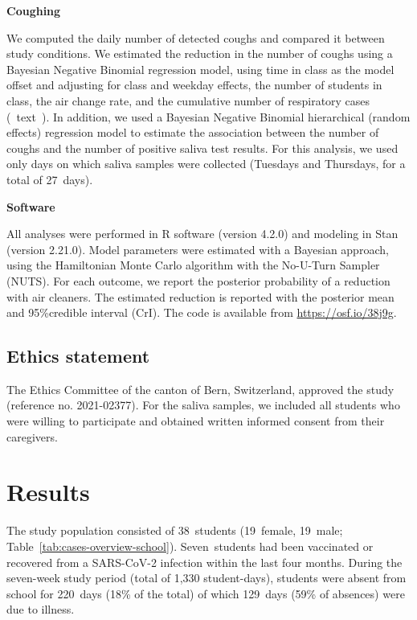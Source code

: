 \documentclass[fleqn,11pt]{wlscirep}
\begin{document}
\noindent\textbf{Coughing} \smallskip

\noindent We computed the daily number of detected coughs and compared it between study conditions. We estimated the reduction in the number of coughs using a Bayesian Negative Binomial regression model, using time in class as the model offset and adjusting for class and weekday effects, the number of students in class, the air change rate, and the cumulative number of respiratory cases (\supp~text~). In addition, we used a Bayesian Negative Binomial hierarchical (random effects) regression model to estimate the association between the number of coughs and the number of positive saliva test results. For this analysis, we used only days on which saliva samples were collected (Tuesdays and Thursdays, for a total of 27~days).  \medskip

\noindent\textbf{Software}\smallskip

\noindent All analyses were performed in R software (version 4.2.0)\cite{RCoreTeam2022} and modeling in Stan (version 2.21.0)\cite{Carpenter2017}. Model parameters were estimated with a Bayesian approach, using the Hamiltonian Monte Carlo algorithm with the No-U-Turn Sampler (NUTS)\cite{Hoffman2014}. For each outcome, we report the posterior probability of a reduction with air cleaners. The estimated reduction is reported with the posterior mean and 95\%credible interval (CrI). The code is available from \url{https://osf.io/38j9g}.


\subsection*{Ethics statement}

\noindent The Ethics Committee of the canton of Bern, Switzerland, approved the study (reference no. 2021-02377). For the saliva samples, we included all students who were willing to participate and obtained written informed consent from their caregivers.


\newpage

\section*{Results}

The study population consisted of 38~students (19~female, 19~male; Table~\ref{tab:cases-overview-school}). Seven~students had been vaccinated or recovered from a SARS-CoV-2 infection within the last four months. During the seven-week study period (total of 1,330 student-days), students were absent from school for 220~days (18\% of the total) of which 129~days (59\% of absences) were due to illness.  
\end{document}
